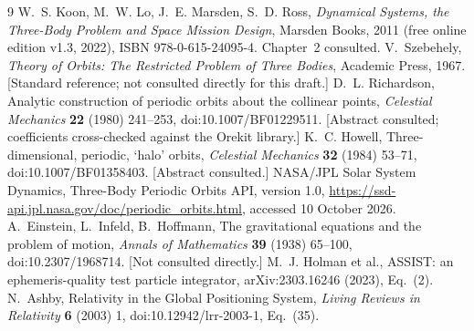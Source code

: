 \documentclass[11pt,a4paper]{article}
\begin{document}
\begin{thebibliography}{9}\small
{} W.~S. Koon, M.~W. Lo, J.~E. Marsden, S.~D. Ross, \emph{Dynamical Systems, the Three-Body Problem and Space Mission Design},
 Marsden Books, 2011 (free online edition v1.3, 2022), ISBN 978-0-615-24095-4. Chapter~2 consulted.
 V.~Szebehely, \emph{Theory of Orbits: The Restricted Problem of Three Bodies}, Academic Press, 1967.
 [Standard reference; not consulted directly for this draft.]
 D.~L. Richardson, Analytic construction of periodic orbits about the collinear points,
 \emph{Celestial Mechanics} \textbf{22} (1980) 241--253, doi:10.1007/BF01229511. [Abstract consulted; coefficients cross-checked against the Orekit library.]
 K.~C. Howell, Three-dimensional, periodic, `halo' orbits, \emph{Celestial Mechanics} \textbf{32} (1984) 53--71,
 doi:10.1007/BF01358403. [Abstract consulted.]
 NASA/JPL Solar System Dynamics, Three-Body Periodic Orbits API, version 1.0,
 \url{https://ssd-api.jpl.nasa.gov/doc/periodic_orbits.html}, accessed 10 October 2026.
 A.~Einstein, L.~Infeld, B.~Hoffmann, The gravitational equations and the problem of motion,
 \emph{Annals of Mathematics} \textbf{39} (1938) 65--100, doi:10.2307/1968714. [Not consulted directly.]
 M.~J. Holman et al., ASSIST: an ephemeris-quality test particle integrator, arXiv:2303.16246 (2023), Eq.~(2).
 N.~Ashby, Relativity in the Global Positioning System, \emph{Living Reviews in Relativity} \textbf{6} (2003) 1,
 doi:10.12942/lrr-2003-1, Eq.~(35).
\end{thebibliography}
\end{document}
